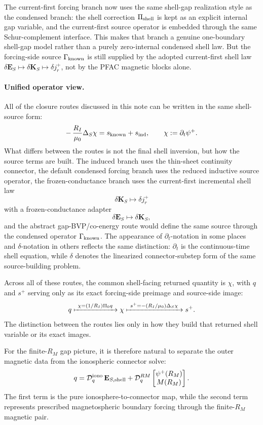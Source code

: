 \documentclass[11pt,a4paper]{article}
\begin{document}
The current-first forcing branch now uses the same shell-gap realization style
as the condensed branch: the shell correction \(\Pi_{\rm shell}\) is kept as
an explicit internal gap variable, and the current-first source operator is
embedded through the same Schur-complement interface. This makes that branch a
genuine one-boundary shell-gap model rather than a purely zero-internal
condensed shell law. But the forcing-side source \(\Gamma_{\rm known}\) is
still supplied by the adopted current-first shell law
\(\delta\mathbf E_S\mapsto \delta\mathbf K_S\mapsto \delta j_r^+\), not by the
PFAC magnetic blocks alone.

\paragraph{Unified operator view.}
All of the closure routes discussed in this note can be written in the same
shell-source form:
\begin{equation}
-\,\frac{R_I}{\mu_0}\Delta_S\chi
=
s_{\rm known} + s_{\rm ind},
\qquad
\chi:=\partial_t\psi^+.
\label{eq:unified_shell_source_view}
\end{equation}
What differs between the routes is not the final shell inversion, but how the
source terms are built. The induced branch uses the thin-sheet continuity
connector, the default condensed forcing branch uses the reduced inductive
source operator, the frozen-conductance branch uses the current-first
incremental shell law
\[
\delta\mathbf K_S \mapsto \delta j_r^+
\]
with a frozen-conductance adapter
\[
\delta\mathbf E_S \mapsto \delta\mathbf K_S,
\]
and the abstract gap-BVP/co-energy route would define the same source through
the condensed operator \(\Gamma_{\rm known}\). The appearance of
\(\partial_t\)-notation in some places and \(\delta\)-notation in others
reflects the same distinction: \(\partial_t\) is the continuous-time shell
equation, while \(\delta\) denotes the linearized connector-substep form of
the same source-building problem.

Across all of these routes, the common shell-facing returned quantity is
\(\chi\), with \(q\) and \(s^+\) serving only as its exact forcing-side
preimage and source-side image:
\[
q \xmapsto{\ \chi=(1/R_I)\Pi_0 q\ } \chi
\xmapsto{\ s^+=-(R_I/\mu_0)\Delta_S\chi\ } s^+.
\]
The distinction between the routes lies only in how they build that returned
shell variable or its exact images.

For the finite-\(R_M\) gap picture, it is therefore natural to separate the
outer magnetic data from the ionospheric connector solve:
\[
q = \mathcal D_q^{\rm iono}\,\mathbf E_{S,\rm shell}
  + \mathcal D_q^{RM}
  \begin{bmatrix}
    \psi^+(R_M)\\
    M(R_M)
  \end{bmatrix}.
\]
The first term is the pure ionosphere-to-connector map, while the second term
represents prescribed magnetospheric boundary forcing through the finite-\(R_M\)
magnetic pair.
\end{document}
